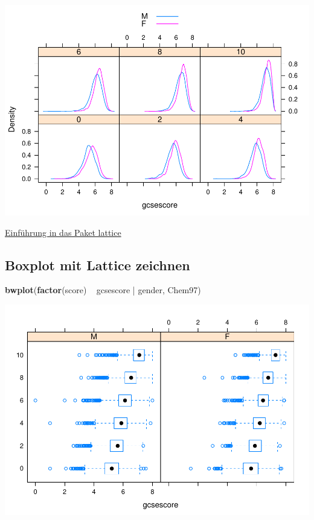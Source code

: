 \documentclass[]{article}
\newenvironment{Shaded}{\begin{snugshade}}{\end{snugshade}}
\newcommand{\KeywordTok}[1]{\textcolor[rgb]{0.13,0.29,0.53}{\textbf{{#1}}}}
\newcommand{\StringTok}[1]{\textcolor[rgb]{0.31,0.60,0.02}{{#1}}}
\newcommand{\NormalTok}[1]{{#1}}
\begin{document}
\includegraphics{Intro_Datenanalyse1_files/figure-latex/unnamed-chunk-173-1.pdf}

\href{http://www.isid.ac.in/~deepayan/R-tutorials/labs/04_lattice_lab.pdf}{Einführung
in das Paket lattice}

\subsection{Boxplot mit Lattice
zeichnen}\label{boxplot-mit-lattice-zeichnen}

\begin{Shaded}
\begin{Highlighting}[]
\KeywordTok{bwplot}\NormalTok{(}\KeywordTok{factor}\NormalTok{(score) ~}\StringTok{ }\NormalTok{gcsescore |}\StringTok{ }\NormalTok{gender, Chem97)}
\end{Highlighting}
\end{Shaded}

\includegraphics{Intro_Datenanalyse1_files/figure-latex/unnamed-chunk-174-1.pdf}
\end{document}
